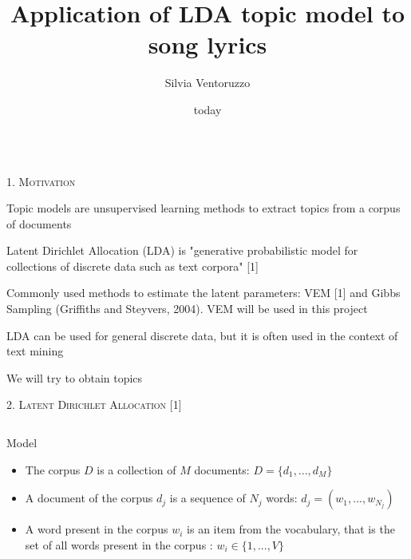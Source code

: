 \documentclass[fleqn,final]{beamer}
\title{\huge Application of LDA topic model to song lyrics} %
\author{\large Silvia Ventoruzzo}
\institute{Freie Universität Berlin} %
\date{today}
\begin{document}
\begin{frame}
      
\vspace{-1cm} 
 \begin{columns}[t]
      \begin{column}{.50\linewidth}
        \begin{block}{\rule[-2.5mm]{0cm}{1cm}\textsc{1. Motivation}}


\begin{itemize}\small{
    \item Topic models are unsupervised learning methods to extract topics from a corpus of documents
    \item Latent Dirichlet Allocation (LDA) is "generative probabilistic model for collections of discrete data such as text corpora" [1]
    \item Commonly used methods to estimate the latent parameters: VEM [1] and Gibbs Sampling (Griffiths and Steyvers, 2004). VEM will be used in this project
    \item LDA can be used for general discrete data, but it is often used in the context of text mining
    \item We will try to obtain topics
}
\end{itemize}
\vspace{0.5cm}
\vspace{0.5cm}

\end{block}
\vspace{-1cm}

\begin{block}{\rule[-2.5mm]{0cm}{1cm}\textsc{2. Latent Dirichlet Allocation [1]}}
\begin{columns}[t]
\begin{column}{.47\linewidth}
{\small 
\vspace{-1.3cm}	
\begin{block}{\small{Model}}
\vspace{0.2cm}	
\begin{itemize}
    \item The corpus $D$ is a collection of $M$ documents: $D = \{d_1, ..., d_M\}$
    \item A document of the corpus $d_j$ is a sequence of $N_j$ words: $d_j = (w_1, ..., w_{N_j})$
    \item A word present in the corpus $w_i$ is an item from the vocabulary, that is the set of all words present in the corpus \citep{ponweiser2012latent}: $w_i \in \{1, ..., V\}$
\end{itemize}


\end{block}}
\end{column}
\end{columns}
\end{block}
\end{column}
\end{columns}
\end{frame}
\end{document}
